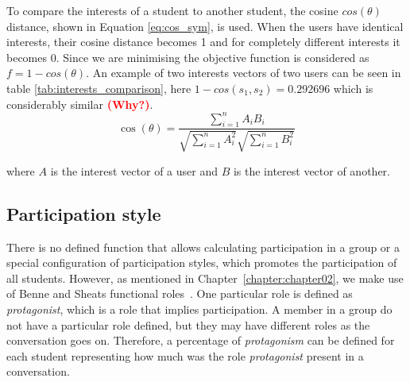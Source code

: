 \begin{table}[]

\caption{Comparison of interests between $s_1$ and $s_2$.}
\label{tab:interests_comparison}

\centering
{}
\end{table}

To compare the interests of a student to another student, the cosine $cos(\theta)$ distance, shown in Equation \ref{eq:cos_sym}, is used. When the users have identical interests, their cosine distance becomes 1 and for completely different interests it becomes 0. Since we are minimising the objective function is considered as $f = 1 - cos(\theta)$. An example of two interests vectors of two users can be seen in table \ref{tab:interests_comparison}, here $1 - cos(s_1,s_2) = 0.292696$ which is considerably similar \textcolor{red}{\bf (Why?)}.\\

\begin{equation} \label{eq:cos_sym}
    \cos(\theta) = \frac{ \sum\limits_{i=1}^{n}{A_i  B_i} }{ \sqrt{\sum\limits_{i=1}^{n}{A_i^2}}  \sqrt{\sum\limits_{i=1}^{n}{B_i^2}} }   
\end{equation}

\noindent where $A$ is the interest vector of a user and $B$ is the interest vector of another.

\subsection{Participation style}

There is no defined function that allows calculating participation in a group or a special configuration of participation styles, which promotes the participation of all students. 
However, as mentioned in Chapter~\ref{chapter:chapter02}, we make use of Benne and Sheats functional roles~\cite{FunctionalRoles}. One particular role is defined as \textit{protagonist}, which is a role that implies participation. A member in a group do not have a particular role defined, but they may have different roles as the conversation goes on. Therefore, a percentage of \textit{protagonism} can be defined for each student representing how much was the role \textit{protagonist} present in a conversation.\\

